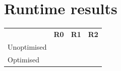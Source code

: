 \section{Runtime results}
\label{sec:runtime-results}

\begin{tabular}{l|c|c|c}
& \textbf{R0} & \textbf{R1} & \textbf{R2} \\
Unoptimised & & \\
Optimised   & & & \\
\end{tabular}

